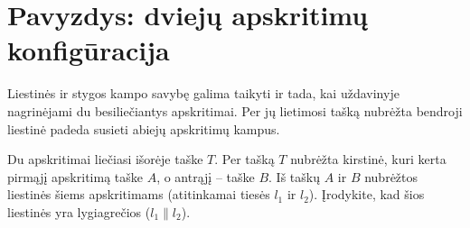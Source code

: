 \documentclass[11pt,a4paper]{scrartcl}
\begin{document}
\section{Pavyzdys: dviejų apskritimų konfigūracija}
Liestinės ir stygos kampo savybę galima taikyti ir tada, kai uždavinyje nagrinėjami du besiliečiantys apskritimai. Per jų lietimosi tašką nubrėžta bendroji liestinė padeda susieti abiejų apskritimų kampus.

\begin{example}
Du apskritimai liečiasi išorėje taške \(T\). Per tašką \(T\) nubrėžta kirstinė, kuri kerta pirmąjį apskritimą taške \(A\), o antrąjį – taške \(B\). Iš taškų \(A\) ir \(B\) nubrėžtos liestinės šiems apskritimams (atitinkamai tiesės \(l_1\) ir \(l_2\)). Įrodykite, kad šios liestinės yra lygiagrečios (\(l_1 \parallel l_2\)).
\end{example}
\end{document}
